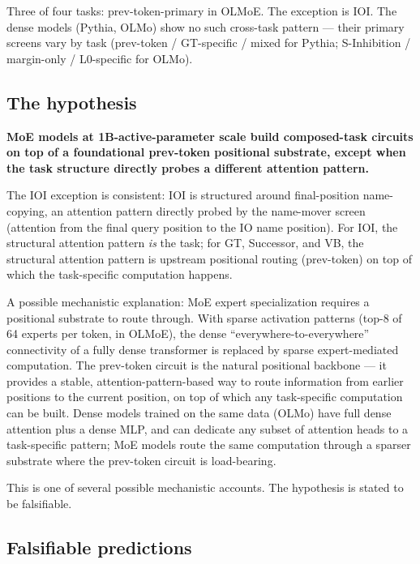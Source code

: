\documentclass[11pt]{article}
\begin{document}
Three of four tasks: prev-token-primary in OLMoE. The exception is IOI. The dense models (Pythia, OLMo) show no such cross-task pattern --- their primary screens vary by task (prev-token / GT-specific / mixed for Pythia; S-Inhibition / margin-only / L0-specific for OLMo).

\subsection{The hypothesis}

\textbf{MoE models at 1B-active-parameter scale build composed-task circuits on top of a foundational prev-token positional substrate, except when the task structure directly probes a different attention pattern.}

The IOI exception is consistent: IOI is structured around final-position name-copying, an attention pattern directly probed by the name-mover screen (attention from the final query position to the IO name position). For IOI, the structural attention pattern \emph{is} the task; for GT, Successor, and VB, the structural attention pattern is upstream positional routing (prev-token) on top of which the task-specific computation happens.

A possible mechanistic explanation: MoE expert specialization requires a positional substrate to route through. With sparse activation patterns (top-8 of 64 experts per token, in OLMoE), the dense ``everywhere-to-everywhere'' connectivity of a fully dense transformer is replaced by sparse expert-mediated computation. The prev-token circuit is the natural positional backbone --- it provides a stable, attention-pattern-based way to route information from earlier positions to the current position, on top of which any task-specific computation can be built. Dense models trained on the same data (OLMo) have full dense attention plus a dense MLP, and can dedicate any subset of attention heads to a task-specific pattern; MoE models route the same computation through a sparser substrate where the prev-token circuit is load-bearing.

This is one of several possible mechanistic accounts. The hypothesis is stated to be falsifiable.

\subsection{Falsifiable predictions}
\end{document}
